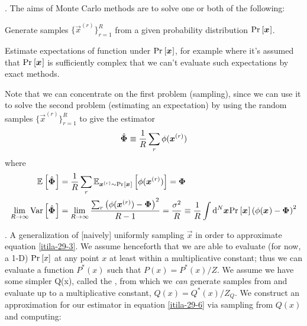 \documentclass[11pt]{article}
\begin{document}
\p {}. The aims of Monte Carlo methods are to solve one or both of the following:
\begin{compactenum}
	\item Generate samples $\{\vec{x}^{(r)}\}_{r = 1}^{R}$ from a given probability distribution $\Prob{\vec x}$. 
	
	\item Estimate expectations of function under $\Prob{\vec x}$, for example
	where it's assumed that $\Prob{\vec x}$ is sufficiently complex that we can't evaluate such expectations by exact methods.
\end{compactenum}
Note that we can concentrate on the first problem (sampling), since we can use it to solve the second problem (estimating an expectation) by using the random samples $\{\vec{x}^{(r)}\}_{r = 1}^{R}$ to give the estimator
\begin{align}
	\hat{\vec{\Phi}} \equiv \inv{R} \sum_r \phi(\vec{x}^{(r)}) \label{itila-29-6}
\end{align}
where
\begin{align}
	\E{\hat{\vec{\Phi}}} &= \inv{R} \sum_r \E[\vec{x}^{(r)} \sim \Prob{\vec x}]{\phi(\vec{x}^{(r)})} = \vec{\Phi} \\
	\lim_{R \rightarrow \infty} \Var{\hat{\vec{\Phi}}} &= \lim_{R \rightarrow \infty} \frac{
			\sum_r \left( \phi(\vec{x}^{(r)}) - \vec{\Phi} \right)^2       }{R - 1} = \frac{\sigma^2}{R} \equiv \inv{R} \int \mathrm{d}^N\vec{x} \Prob{\vec x} \left(   \phi(\vec{x}) - \vec{\Phi} \right)^2
\end{align}

\myspace
\p {}. A generalization of [naively] uniformly sampling $\vec{x}$ in order to approximate equation \ref{itila-29-3}. We assume henceforth that we are able to evaluate (for now, a 1-D) $\Prob{x}$ at any point $x$ at least within a multiplicative constant; thus we can evaluate a function $P^*(x)$ such that $P(x) = P^*(x) / Z$. We assume we have some simpler Q(x), called the , from which we \textit{can} generate samples from and evaluate up to a multiplicative constant, $Q(x) = Q^*(x) / Z_Q$. We construct an approximation for our estimator in equation \ref{itila-29-6} via sampling from $Q(x)$ and computing:
\end{document}
